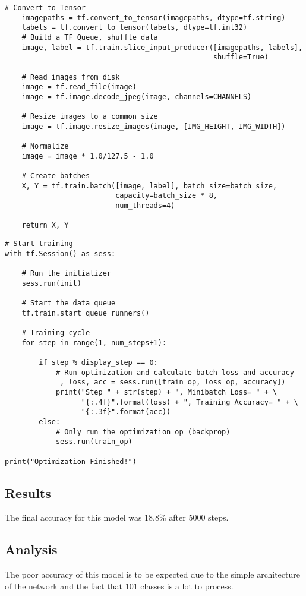 \begin{lstlisting}
# Convert to Tensor
    imagepaths = tf.convert_to_tensor(imagepaths, dtype=tf.string)
    labels = tf.convert_to_tensor(labels, dtype=tf.int32)
    # Build a TF Queue, shuffle data
    image, label = tf.train.slice_input_producer([imagepaths, labels],
                                                 shuffle=True)

    # Read images from disk
    image = tf.read_file(image)
    image = tf.image.decode_jpeg(image, channels=CHANNELS)

    # Resize images to a common size
    image = tf.image.resize_images(image, [IMG_HEIGHT, IMG_WIDTH])

    # Normalize
    image = image * 1.0/127.5 - 1.0

    # Create batches
    X, Y = tf.train.batch([image, label], batch_size=batch_size,
                          capacity=batch_size * 8,
                          num_threads=4)

    return X, Y

\end{lstlisting}

\begin{lstlisting}
# Start training
with tf.Session() as sess:

    # Run the initializer
    sess.run(init)

    # Start the data queue
    tf.train.start_queue_runners()

    # Training cycle
    for step in range(1, num_steps+1):

        if step % display_step == 0:
            # Run optimization and calculate batch loss and accuracy
            _, loss, acc = sess.run([train_op, loss_op, accuracy])
            print("Step " + str(step) + ", Minibatch Loss= " + \
                  "{:.4f}".format(loss) + ", Training Accuracy= " + \
                  "{:.3f}".format(acc))
        else:
            # Only run the optimization op (backprop)
            sess.run(train_op)

print("Optimization Finished!")
\end{lstlisting}

\subsection*{Results}
The final accuracy for this model was 18.8\% after 5000 steps.

\subsection*{Analysis}
The poor accuracy of this model is to be expected due to the simple architecture of the network and the fact that 101 classes is a lot to process.